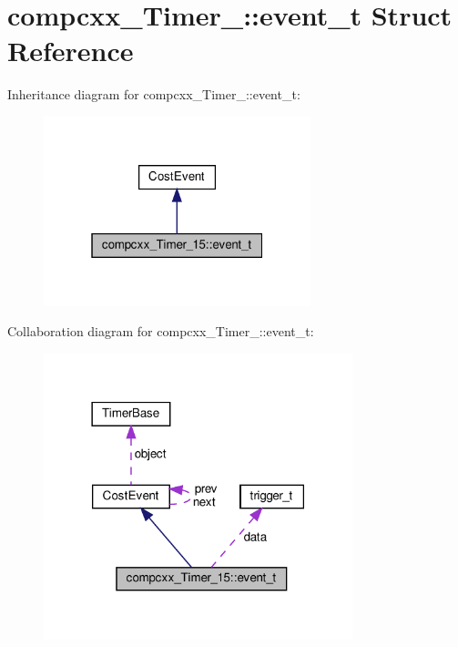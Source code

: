 \hypertarget{structcompcxx__Timer__15_1_1event__t}{}\section{compcxx\+\_\+\+Timer\+\_\+:\+:event\+\_\+t Struct Reference}
\label{structcompcxx__Timer__15_1_1event__t}


Inheritance diagram for compcxx\+\_\+\+Timer\+\_\+:\+:event\+\_\+t\+:\nopagebreak
\begin{figure}[H]
\begin{center}
\leavevmode
\includegraphics[width=220pt]{structcompcxx__Timer__15_1_1event__t__inherit__graph}
\end{center}
\end{figure}


Collaboration diagram for compcxx\+\_\+\+Timer\+\_\+:\+:event\+\_\+t\+:\nopagebreak
\begin{figure}[H]
\begin{center}
\leavevmode
\includegraphics[width=254pt]{structcompcxx__Timer__15_1_1event__t__coll__graph}
\end{center}
\end{figure}
